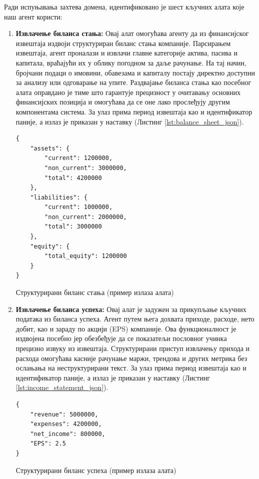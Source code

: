 Ради испуњавања захтева домена, идентификовано је шест кључних алата које наш агент користи:
\begin{enumerate}
    \item \textbf{Извлачење биланса стања:} Овај алат омогућава агенту да из финансијског извештаја издвоји структуриран биланс стања компаније. Парсирањем извештаја, агент проналази и извлачи главне категорије актива, пасива и капитала, враћајући их у облику погодном за даље рачунање. На тај начин, бројчани подаци о имовини, обавезама и капиталу постају директно доступни за анализу или одговарање на упите. Раздвајање биланса стања као посебног алата оправдано је тиме што гарантује прецизност у очитавању основних финансијских позиција и омогућава да се оне лако прослеђују другим компонентама система. За улаз прима период извештаја као и идентификатор паније, а излаз је приказан у наставку (Листинг \ref{lst:balance_sheet_json}).

    \begin{center}
    \begin{listing}[!ht]
    \begin{verbatim}
{
    "assets": {
        "current": 1200000,
        "non_current": 3000000,
        "total": 4200000
    },
    "liabilities": {
        "current": 1000000,
        "non_current": 2000000,
        "total": 3000000
    },
    "equity": {
        "total_equity": 1200000
    }
}
    \end{verbatim}
    \caption{Структурирани биланс стања (пример излаза алата)}\label{lst:balance_sheet_json}
    \end{listing}
    \end{center}

    \item \textbf{Извлачење биланса успеха:} Овај алат је задужен за прикупљање кључних података из биланса успеха. Агент путем њега дохвата приходе, расходе, нето добит, као и зараду по акцији (EPS) компаније. Ова функционалност је издвојена посебно јер обезбеђује да се показатељи пословног учинка прецизно извуку из извештаја. Структурирани приступ извлачењу прихода и расхода омогућава касније рачунање маржи, трендова и других метрика без ослањања на неструктурирани текст. За улаз прима период извештаја као и идентификатор паније, а излаз је приказан у наставку (Листинг \ref{lst:income_statement_json}).

    \begin{center}
    \begin{listing}[!ht]
    \begin{verbatim}
{
    "revenue": 5000000,
    "expenses": 4200000,
    "net_income": 800000,
    "EPS": 2.5
}
    \end{verbatim}
    \caption{Структурирани биланс успеха (пример излаза алата)}\label{lst:income_statement_json}
    \end{listing}
    \end{center}


\end{enumerate}
